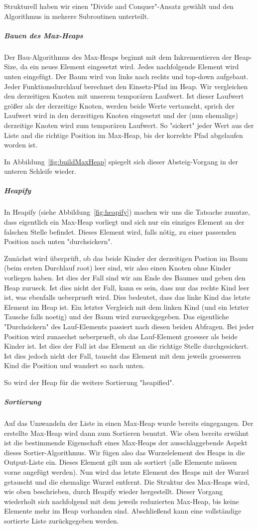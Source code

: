 Strukturell haben wir einen "Divide and Conquer"-Ansatz gewählt und den
Algorithmus in mehrere Subroutinen unterteilt.

\subparagraph{Bauen des Max-Heaps}
Der Bau-Algorithmus des Max-Heaps beginnt mit dem Inkrementieren der Heap-Size, da ein neues Element eingesetzt wird.
Jedes nachfolgende Element wird unten eingefügt.
Der Baum wird von links nach rechts und top-down aufgebaut.
Jeder Funktionsdurchlauf berechnet den Einsetz-Pfad im Heap.
Wir vergleichen den derzeitigen Knoten mit unserem temporären Laufwert.
Ist dieser Laufwert größer als der derzeitige Knoten, werden beide Werte vertauscht, sprich der Laufwert wird in den derzeitigen Knoten eingesetzt und der (nun ehemalige) derzeitige Knoten wird zum temporären Laufwert.
So "sickert" jeder Wert aus der Liste and die richtige Position im Max-Heap, bis der korrekte Pfad abgelaufen worden ist.

In Abbildung~\ref{fig:buildMaxHeap} spiegelt sich dieser Absteig-Vorgang
in der unteren Schleife wieder.

\subparagraph{Heapify}
In Heapify (siehe Abbildung~\ref{fig:heapify}) machen wir uns die
Tatsache zunutze, dass eigentlich ein
Max-Heap vorliegt und sich nur ein einziges Element an der falschen
Stelle befindet.
Dieses Element wird, falls nötig, zu einer passenden Position nach unten
"durchsickern".

Zunächst wird überprüft, ob das beide Kinder der derzeitigen Postion im Baum (beim ersten Durchlauf root) leer sind, wir also einen Knoten ohne Kinder vorliegen haben.
Ist dies der Fall sind wir am Ende des Baumes und geben den Heap zurueck.
Ist dies nicht der Fall, kann es sein, dass nur das rechte Kind leer ist, was ebenfalls ueberprueft wird.
Dies bedeutet, dass das linke Kind das letzte Element im Heap ist.
Ein letzter Vergleich mit dem linken Kind (und ein letzter Tausche falls noetig) und der Baum wird zurueckgegeben.
Das eigentliche "Durchsickern" des Lauf-Elements passiert nach diesen beiden Abfragen.
Bei jeder Position wird zunaechst ueberprueft, ob das Lauf-Element groesser als beide Kinder ist.
Ist dies der Fall ist das Element an die richtige Stelle durchgesickert.
Ist dies jedoch nicht der Fall, tauscht das Element mit dem jeweils groesseren Kind die Position und wandert so nach unten.

So wird der Heap für die weitere Sortierung "heapified".

\subparagraph{Sortierung}
Auf das Umwandeln der Liste in einen Max-Heap wurde bereits eingegangen.
Der erstellte Max-Heap wird dann zum Sortieren benutzt.
Wie oben bereits erwähnt ist die bestimmende Eigenschaft eines Max-Heaps
der ausschlaggebende Aspekt dieses Sortier-Algorithmus.
Wir fügen also das Wurzelelement des Heaps in die Output-Liste ein.
Dieses Element gilt nun als sortiert (alle Elemente müssen vorne angefügt
werden).
Nun wird das letzte Element des Heaps mit der Wurzel getauscht und die
ehemalige Wurzel entfernt.
Die Struktur des Max-Heaps wird, wie oben beschrieben, durch Heapify
wieder hergestellt.
Dieser Vorgang wiederholt sich nachfolgend mit dem jeweils reduzierten
Max-Heap, bis keine Elemente mehr im Heap vorhanden sind.
Abschließend kann eine vollständige sortierte Liste zurückgegeben werden.

